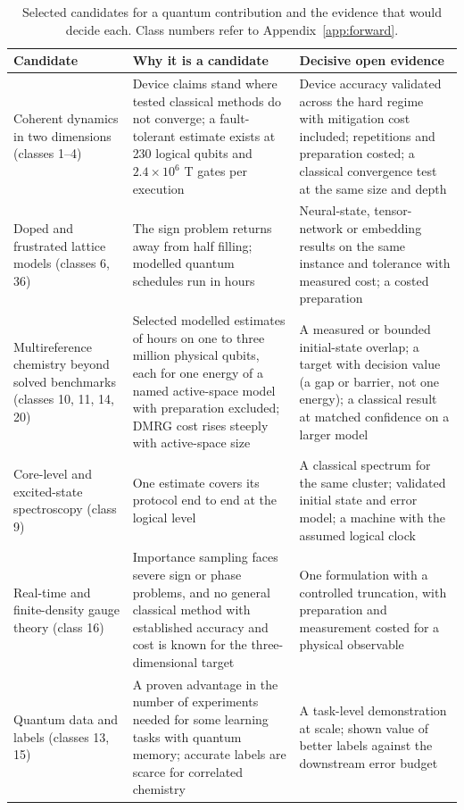 \begin{table}[htbp]
\centering\small
\caption{Selected candidates for a quantum contribution and the evidence that would decide each. Class numbers refer to Appendix~\ref{app:forward}.}\label{tab:opps}
\begin{tabular}{@{}L{3.3cm} L{5.8cm} L{6.7cm}@{}}
\toprule
Candidate & Why it is a candidate & Decisive open evidence\\\midrule
Coherent dynamics in two dimensions (classes 1--4) & Device claims stand where tested classical methods do not converge; a fault-tolerant estimate exists at 230 logical qubits and $2.4\times10^6$ T gates per execution & Device accuracy validated across the hard regime with mitigation cost included; repetitions and preparation costed; a classical convergence test at the same size and depth\\
Doped and frustrated lattice models (classes 6, 36) & The sign problem returns away from half filling; modelled quantum schedules run in hours & Neural-state, tensor-network or embedding results on the same instance and tolerance with measured cost; a costed preparation\\
Multireference chemistry beyond solved benchmarks (classes 10, 11, 14, 20) & Selected modelled estimates of hours on one to three million physical qubits, each for one energy of a named active-space model with preparation excluded; DMRG cost rises steeply with active-space size & A measured or bounded initial-state overlap; a target with decision value (a gap or barrier, not one energy); a classical result at matched confidence on a larger model\\
Core-level and excited-state spectroscopy (class 9) & One estimate covers its protocol end to end at the logical level & A classical spectrum for the same cluster; validated initial state and error model; a machine with the assumed logical clock\\
Real-time and finite-density gauge theory (class 16) & Importance sampling faces severe sign or phase problems, and no general classical method with established accuracy and cost is known for the three-dimensional target & One formulation with a controlled truncation, with preparation and measurement costed for a physical observable\\
Quantum data and labels (classes 13, 15) & A proven advantage in the number of experiments needed for some learning tasks with quantum memory; accurate labels are scarce for correlated chemistry & A task-level demonstration at scale; shown value of better labels against the downstream error budget\\
\bottomrule
\end{tabular}
\end{table}

